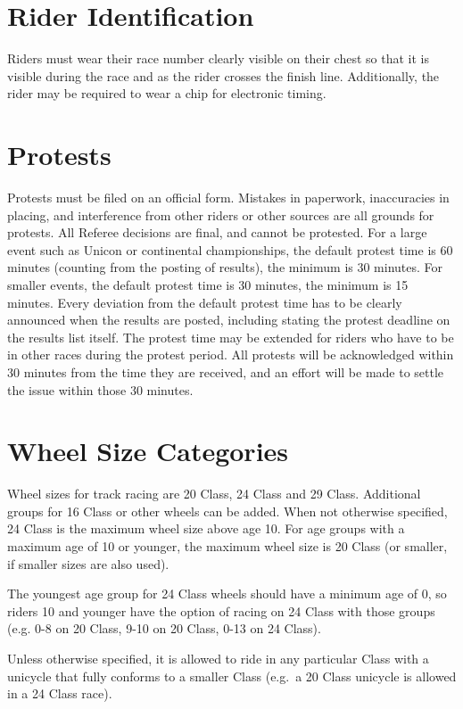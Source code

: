 \section{Rider Identification}

Riders must wear their race number clearly visible on their chest so that it is visible during the race and as the rider crosses the finish line.
Additionally, the rider may be required to wear a chip for electronic timing.

\section{Protests}

Protests must be filed on an official form.
Mistakes in paperwork, inaccuracies in placing, and interference from other riders or other sources are all grounds for protests.
All Referee decisions are final, and cannot be protested.
For a large event such as Unicon or continental championships, the default protest time is 60 minutes (counting from the posting of results), the minimum is 30 minutes.
For smaller events, the default protest time is 30 minutes, the minimum is 15 minutes.
Every deviation from the default protest time has to be clearly announced when the results are posted, including stating the protest deadline on the results list itself.
The protest time may be extended for riders who have to be in other races during the protest period.
All protests will be acknowledged within 30 minutes from the time they are received, and an effort will be made to settle the issue within those 30 minutes.

\section{Wheel Size Categories}

Wheel sizes for track racing are 20 Class, 24 Class and 29 Class.
Additional groups for 16 Class or other wheels can be added.
When not otherwise specified, 24 Class is the maximum wheel size above age 10.
For age groups with a maximum age of 10 or younger, the maximum wheel size is 20 Class (or smaller, if smaller sizes are also used).

The youngest age group for 24 Class wheels should have a minimum age of 0, so riders 10 and younger have the option of racing on 24 Class with those groups (e.g. 0-8 on 20 Class, 9-10 on 20 Class, 0-13 on 24 Class).

Unless otherwise specified, it is allowed to ride in any particular Class with a unicycle that fully conforms to a smaller Class
(e.g.\ a 20 Class unicycle is allowed in a 24 Class race).

